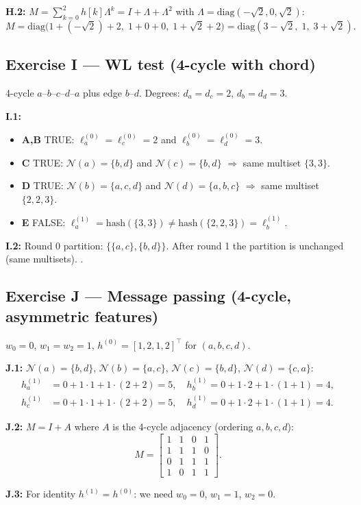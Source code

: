 \documentclass[12pt,a4paper]{article}
\newcommand{\ans}[1]{\tcbox[colback=yellow!20,colframe=orange!60,size=small]{\textbf{#1}}}
\begin{document}
\textbf{H.2:} $M=\sum_{k=0}^{2}h[k]\Lambda^k=I+\Lambda+\Lambda^2$ with $\Lambda=\mathrm{diag}(-\sqrt{2},0,\sqrt{2})$:
\[
  M=\mathrm{diag}\!\bigl(1+(-\sqrt{2})+2,\;1+0+0,\;1+\sqrt{2}+2\bigr)
  =\boxed{\mathrm{diag}(3-\sqrt{2},\;1,\;3+\sqrt{2}).}
\]

\subsection*{Exercise I --- WL test (4-cycle with chord)}

4-cycle $a$--$b$--$c$--$d$--$a$ plus edge $b$--$d$. Degrees: $d_a=d_c=2$, $d_b=d_d=3$.

\textbf{I.1:}
\begin{itemize}[noitemsep]
  \item \textbf{A,B} TRUE: $\ell^{(0)}_a=\ell^{(0)}_c=2$ and $\ell^{(0)}_b=\ell^{(0)}_d=3$.
  \item \textbf{C} TRUE: $\mathcal{N}(a)=\{b,d\}$ and $\mathcal{N}(c)=\{b,d\}$ $\Rightarrow$ same multiset $\{3,3\}$.
  \item \textbf{D} TRUE: $\mathcal{N}(b)=\{a,c,d\}$ and $\mathcal{N}(d)=\{a,b,c\}$ $\Rightarrow$ same multiset $\{2,2,3\}$.
  \item \textbf{E} FALSE: $\ell^{(1)}_a=\mathrm{hash}(\{3,3\})\neq\mathrm{hash}(\{2,2,3\})=\ell^{(1)}_b$.
\end{itemize}
\ans{True: A, B, C, D}

\textbf{I.2:} Round 0 partition: $\{\{a,c\},\{b,d\}\}$. After round 1 the partition is unchanged (same multisets). \ans{1 round}.

\subsection*{Exercise J --- Message passing (4-cycle, asymmetric features)}

$w_0=0$, $w_1=w_2=1$, $h^{(0)}=[1,2,1,2]^\top$ for $(a,b,c,d)$.

\textbf{J.1:} $\mathcal{N}(a)=\{b,d\}$, $\mathcal{N}(b)=\{a,c\}$, $\mathcal{N}(c)=\{b,d\}$, $\mathcal{N}(d)=\{c,a\}$:
\begin{align*}
  h_a^{(1)}&=0+1\cdot 1+1\cdot(2+2)=5,\quad
  h_b^{(1)}=0+1\cdot 2+1\cdot(1+1)=4,\\
  h_c^{(1)}&=0+1\cdot 1+1\cdot(2+2)=5,\quad
  h_d^{(1)}=0+1\cdot 2+1\cdot(1+1)=4.
\end{align*}

\textbf{J.2:} $M=I+A$ where $A$ is the 4-cycle adjacency (ordering $a,b,c,d$):
\[
  M=\begin{bmatrix}1&1&0&1\\1&1&1&0\\0&1&1&1\\1&0&1&1\end{bmatrix}.
\]

\textbf{J.3:} For identity $h^{(1)}=h^{(0)}$: we need $w_0=0$, $w_1=1$, $w_2=0$.
\end{document}
